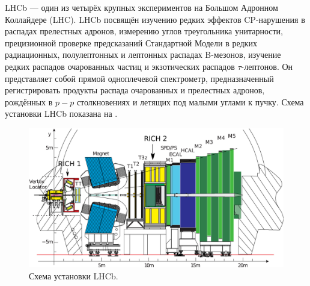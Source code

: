 LHCb --- один из четырёх крупных экспериментов на Большом Адронном Коллайдере (LHC). LHCb посвящён изучению редких эффектов CP-нарушения в распадах прелестных адронов, измерению углов треугольника унитарности, прецизионной проверке предсказаний Стандартной Модели в редких радиационных, полулептонных и лептонных распадах B-мезонов, изучение редких распадов очарованных частиц и экзотических распадов $\tau$-лептонов. Он представляет собой прямой одноплечевой спектрометр, предназначенный регистрировать продукты распада очарованных и прелестных адронов, рождённых в $p-p$ столкновениях и летящих под малыми углами к пучку. Схема установки LHCb показана на .


\begin{figure}[H]
\centering
\includegraphics[width=1.0\textwidth]{pictures/LHCb.png}
\caption{Схема установки LHCb.}
\label{fig:LHCb}
\end{figure}






